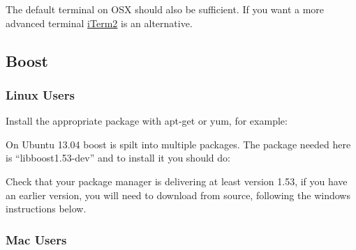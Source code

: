 \begin{Shaded}
\begin{Highlighting}[]
 
\end{Highlighting}
\end{Shaded}

The default terminal on OSX should also be sufficient. If you want a
more advanced terminal \href{http://www.iterm2.com/}{iTerm2} is an
alternative.

\subsection{Boost}\label{boost}

\subsubsection{Linux Users}\label{linux-users}

Install the appropriate package with apt-get or yum, for example:

\begin{Shaded}
\begin{Highlighting}[]
 
\end{Highlighting}
\end{Shaded}

On Ubuntu 13.04 boost is spilt into multiple packages. The package
needed here is ``libboost1.53-dev'' and to install it you should do:

\begin{Shaded}
\begin{Highlighting}[]
 
\end{Highlighting}
\end{Shaded}

Check that your package manager is delivering at least version 1.53, if
you have an earlier version, you will need to download from source,
following the windows instructions below.

\subsubsection{Mac Users}\label{mac-users}

\begin{Shaded}
\begin{Highlighting}[]
 
\end{Highlighting}
\end{Shaded}

